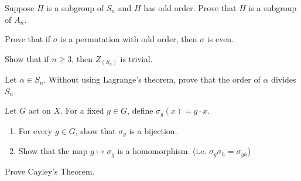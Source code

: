 \documentclass[./main.tex]{subfiles}
\begin{document}
\begin{exercise}
    Suppose $H$ is a subgroup of $S_n$ and $H$ has odd order. Prove that $H$ is
    a subgroup of $A_n$.
\end{exercise}

\begin{exercise}
    Prove that if $\sigma$ is a permutation with odd order, then $\sigma$ is
    even.
\end{exercise}

\begin{exercise}
    Show that if $n \geq 3$, then $Z_(S_n)$ is trivial. 
\end{exercise}

\begin{exercise}
    Let $\alpha \in S_n$. Without using Lagrange's theorem, prove that the order
    of $\alpha$ divides $S_n$. 
\end{exercise}

\begin{exercise}
\label{ex:group-actions-symmetric-group}
    Let $G$ act on $X$. For a fixed $g \in G$, define $\sigma_g(x) = g \cdot x$. 
    \begin{enumerate}
        \item For every $g \in G$, show that $\sigma_g$ is a bijection.
        \item Show that the map $g \mapsto \sigma_g$ is a homomorphism. (i.e. $\sigma_g \sigma_h = \sigma_{gh}$)
    \end{enumerate}
\end{exercise}

\begin{exercise}
\label{ex:cayley-thm}
    Prove Cayley's Theorem. 
\end{exercise}
\end{document}
